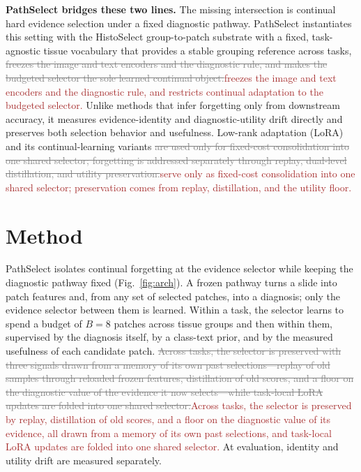 \documentclass{article}
\newif\ifmarkup \markuptrue
\newcommand{\repc}[3]{\ifmarkup\textcolor{gray}{\sout{#2}}\textcolor{#1}{#3}\else#3\fi}
\newcommand{\repB}[2]{\repc{brown}{#1}{#2}}   %
\begin{document}
\textbf{PathSelect bridges these two lines.}
The missing intersection is continual hard evidence selection under a fixed diagnostic pathway. PathSelect instantiates this setting with the HistoSelect group-to-patch substrate with a fixed, task-agnostic tissue vocabulary that provides a stable grouping reference across tasks, \repB{freezes the image and text encoders and the diagnostic rule, and makes the budgeted selector the sole learned continual object.}{freezes the image and text encoders and the diagnostic rule, and restricts continual adaptation to the budgeted selector.} Unlike methods that infer forgetting only from downstream accuracy, it measures evidence-identity and diagnostic-utility drift directly and preserves both selection behavior and usefulness. Low-rank adaptation (LoRA) \cite{hu2022lora} and its continual-learning variants \cite{liang2024inflora,wu2025sdlora,he2025cllora,chen2026flexem} \repB{are used only for fixed-cost consolidation into one shared selector; forgetting is addressed separately through replay, dual-level distillation, and utility preservation.}{serve only as fixed-cost consolidation into one shared selector; preservation comes from replay, distillation, and the utility floor.}

\section{Method}
\label{sec:method}

PathSelect isolates continual forgetting at the evidence selector while keeping the diagnostic pathway fixed (Fig.~\ref{fig:arch}). A frozen pathway turns a slide into patch features and, from any set of selected patches, into a diagnosis; only the evidence selector between them is learned. Within a task, the selector learns to spend a budget of $B=8$ patches across tissue groups and then within them, supervised by the diagnosis itself, by a class-text prior, and by the measured usefulness of each candidate patch. \repB{Across tasks, the selector is preserved with three signals drawn from a memory of its own past selections---replay of old samples through reloaded frozen features, distillation of old scores, and a floor on the diagnostic value of the evidence it now selects---while task-local LoRA updates are folded into one shared selector.}{Across tasks, the selector is preserved by replay, distillation of old scores, and a floor on the diagnostic value of its evidence, all drawn from a memory of its own past selections, and task-local LoRA updates are folded into one shared selector.} At evaluation, identity and utility drift are measured separately.
\end{document}
